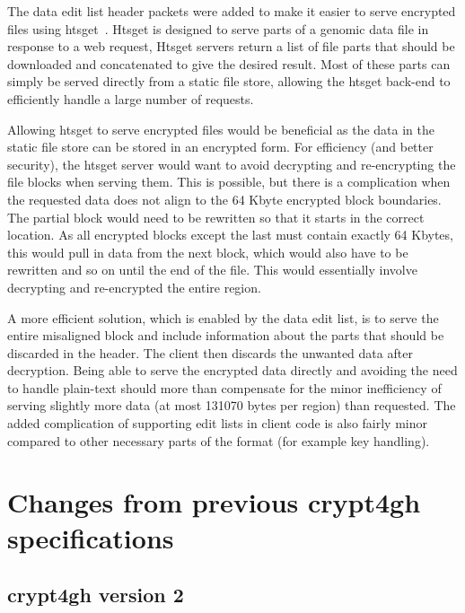 \documentclass[10pt]{article}
\begin{document}
The data edit list header packets were added to make it easier to serve encrypted files using htsget~\cite{htsget}.
Htsget is designed to serve parts of a genomic data file in response to a web request,
Htsget servers return a list of file parts that should be downloaded and concatenated to give the desired result.
Most of these parts can simply be served directly from a static file store, allowing the htsget back-end to efficiently
handle a large number of requests.

Allowing htsget to serve encrypted files would be beneficial as the data in the static file store can be stored in
an encrypted form.
For efficiency (and better security),
the htsget server would want to avoid decrypting and re-encrypting the file blocks when serving them.
This is possible,
but there is a complication when the requested data does not align to the 64 Kbyte encrypted block boundaries.
The partial block would need to be rewritten so that it starts in the correct location.
As all encrypted blocks except the last must contain exactly 64 Kbytes, this would pull in data from the next block,
which would also have to be rewritten and so on until the end of the file.
This would essentially involve decrypting and re-encrypted the entire region.

A more efficient solution, which is enabled by the data edit list, is to serve the entire misaligned block and
include information about the parts that should be discarded in the header.
The client then discards the unwanted data after decryption.
Being able to serve the encrypted data directly and avoiding the need to handle plain-text should more than
compensate for the minor inefficiency of serving slightly more data (at most 131070 bytes per region) than requested.
The added complication of supporting edit lists in client code is also fairly minor compared to other
necessary parts of the format (for example key handling).

\section{Changes from previous crypt4gh specifications}

\subsection{crypt4gh version 2}
\end{document}
